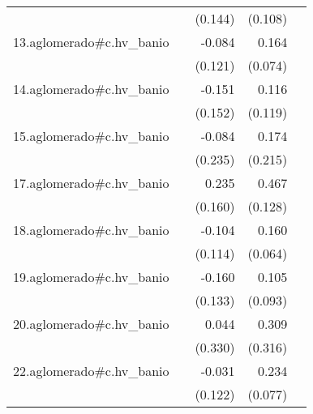 {\begin{longtable}{l*{4}{D{.}{.}{-1}}}
            &                     &     (0.144)         &     (0.108)         &                     \\
\addlinespace
13.aglomerado#c.hv\_banio&                     &      -0.084         &       0.164\sym{*}  &                     \\
            &                     &     (0.121)         &     (0.074)         &                     \\
\addlinespace
14.aglomerado#c.hv\_banio&                     &      -0.151         &       0.116         &                     \\
            &                     &     (0.152)         &     (0.119)         &                     \\
\addlinespace
15.aglomerado#c.hv\_banio&                     &      -0.084         &       0.174         &                     \\
            &                     &     (0.235)         &     (0.215)         &                     \\
\addlinespace
17.aglomerado#c.hv\_banio&                     &       0.235         &       0.467\sym{***}&                     \\
            &                     &     (0.160)         &     (0.128)         &                     \\
\addlinespace
18.aglomerado#c.hv\_banio&                     &      -0.104         &       0.160\sym{*}  &                     \\
            &                     &     (0.114)         &     (0.064)         &                     \\
\addlinespace
19.aglomerado#c.hv\_banio&                     &      -0.160         &       0.105         &                     \\
            &                     &     (0.133)         &     (0.093)         &                     \\
\addlinespace
20.aglomerado#c.hv\_banio&                     &       0.044         &       0.309         &                     \\
            &                     &     (0.330)         &     (0.316)         &                     \\
\addlinespace
22.aglomerado#c.hv\_banio&                     &      -0.031         &       0.234\sym{**} &                     \\
            &                     &     (0.122)         &     (0.077)         &                     \\

\end{longtable}}
